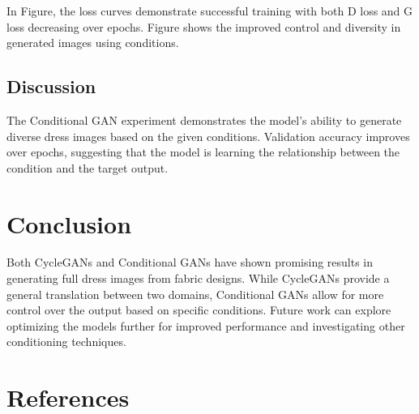 \documentclass{article}
\begin{document}
In Figure, the loss curves demonstrate successful training with both D loss and G loss decreasing over epochs. Figure shows the improved control and diversity in generated images using conditions.

\subsection{Discussion}
The Conditional GAN experiment demonstrates the model's ability to generate diverse dress images based on the given conditions. Validation accuracy improves over epochs, suggesting that the model is learning the relationship between the condition and the target output.

\section{Conclusion}
Both CycleGANs and Conditional GANs have shown promising results in generating full dress images from fabric designs. While CycleGANs provide a general translation between two domains, Conditional GANs allow for more control over the output based on specific conditions. Future work can explore optimizing the models further for improved performance and investigating other conditioning techniques.

\section*{References}
\end{document}
